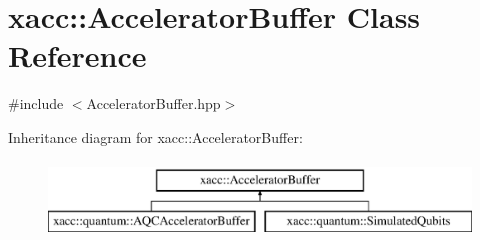 \hypertarget{a00013}{}\section{xacc\+:\+:Accelerator\+Buffer Class Reference}
\label{a00013}


{\ttfamily \#include $<$Accelerator\+Buffer.\+hpp$>$}

Inheritance diagram for xacc\+:\+:Accelerator\+Buffer\+:\begin{figure}[H]
\begin{center}
\leavevmode
\includegraphics[height=2.000000cm]{a00013}
\end{center}
\end{figure}
